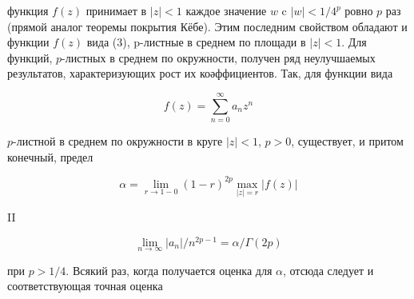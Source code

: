 \documentclass[10pt]{article}
\begin{document}
функция $f(z)$ принимает в $|z|<1$ каждое значение $w$ c $|w|<1 / 4^{p}$ ровно $p$ раз (прямой аналог теоремы покрытия Кёбе). Этим последним свойством обладают и функции $f(z)$ вида (3), p-листные в среднем по площади в $|z|<1$. Для функций, $p$-листных в среднем по окружности, получен ряд неулучшаемых результатов, характеризующих рост их коәффициентов. Так, для функции вида



\[

f(z)=\sum_{n=0}^{\infty} a_{n} z^{n}

\]



$p$-листной в среднем по окружности в круге $|z|<1$, $p>0$, существует, и притом конечный, предел



\[

\alpha=\lim _{r \rightarrow 1-0}(1-r)^{2 p} \max _{|z|=r}|f(z)|

\]



II



\[

\lim _{n \rightarrow \infty}\left|a_{n}\right| / n^{2 p-1}=\alpha / \Gamma(2 p)

\]



при $p>1 / 4$. Всякий раз, когда получается оценка для $\alpha$, отсюда следует и соответствующая точная оценка
\end{document}
